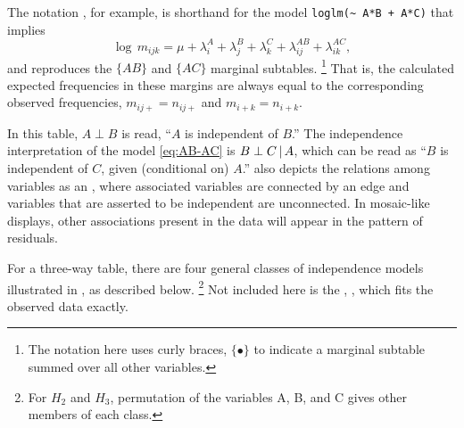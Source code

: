 \documentclass[10pt,krantz2]{krantz}\usepackage[]{graphicx}\usepackage[]{color}
\begin{document}
The notation ,
for example, is shorthand for the model \verb|loglm(~ A*B + A*C)| that implies
\begin{equation} \label{eq:AB-AC}
  \log \,  m_{ijk}  =
  \mu  +  \lambda_i^A
  +  \lambda_j^B
  +  \lambda_k^C
  +  \lambda_{ij}^{AB}
  +  \lambda_{ik}^{AC}
  \comma
\end{equation}
and reproduces the
$\{AB\}$ and $\{AC\}$ marginal subtables.%
\footnote{
The notation here uses curly braces, $\{\bullet\}$ to indicate a marginal
subtable summed over all other variables.
}
That is, the calculated
expected frequencies in these margins are always equal to the
corresponding observed frequencies,
$m_{ij+} = n_{ij+}$ and
$m_{i+k} = n_{i+k}$.



In this table, $A \perp B$ is
read, ``$A$ is independent of $B$.'' The independence interpretation
of the model \eqref{eq:AB-AC} is $B \perp C \, | \, A$,
which can be read as ``$B$ is independent of $C$, given (conditional on) $A$.''
 also
depicts the relations among variables as an
, where associated variables are connected by an edge
and variables that are asserted to be independent are unconnected.
In mosaic-like displays,
other associations present in the data will appear in the pattern of
residuals.

For a three-way table, there are four general classes of independence models
illustrated in , as described below.%
\footnote{For $H_2$ and $H_3$, permutation of the variables A, B, and C gives
other members of each class.}
Not included here
is the , , which fits the observed data
exactly.
\end{document}
